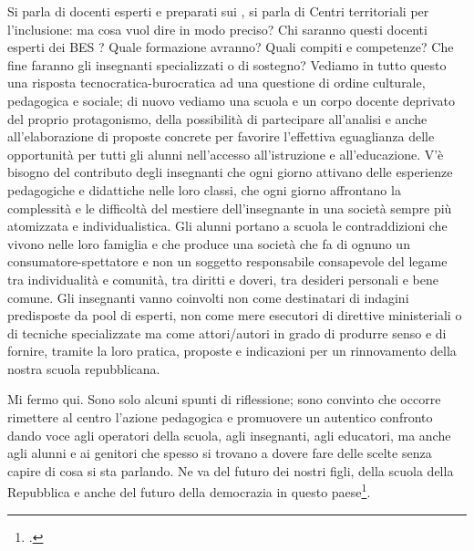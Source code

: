  Si parla di docenti esperti e preparati sui , si parla di Centri territoriali per l'inclusione: ma cosa vuol dire in modo preciso? Chi saranno questi docenti esperti dei BES ? Quale formazione avranno? Quali compiti e competenze? Che fine faranno gli insegnanti specializzati o di sostegno? Vediamo in tutto questo una risposta tecnocratica-burocratica ad una questione di ordine culturale, pedagogica e sociale; di nuovo vediamo una scuola e un corpo docente deprivato del proprio protagonismo, della possibilità di partecipare all'analisi e anche all'elaborazione di proposte concrete per favorire l'effettiva eguaglianza delle opportunità per tutti gli alunni nell'accesso all'istruzione e all'educazione. V'è bisogno del contributo degli insegnanti che ogni giorno attivano delle esperienze pedagogiche e didattiche nelle loro classi, che ogni giorno affrontano la complessità e le difficoltà del mestiere dell'insegnante in una società sempre più atomizzata e individualistica. Gli alunni portano a scuola le contraddizioni che vivono nelle loro famiglia e che produce una società che fa di ognuno un consumatore-spettatore e non un soggetto responsabile consapevole del legame tra individualità e comunità, tra diritti e doveri, tra desideri personali e bene comune. Gli insegnanti vanno coinvolti non come destinatari di indagini predisposte da pool di esperti, non come mere esecutori di direttive ministeriali o di tecniche specializzate ma come attori/autori in grado di produrre senso e di fornire, tramite la loro pratica, proposte e indicazioni per un rinnovamento della nostra scuola repubblicana.
 
 Mi fermo qui. Sono solo alcuni spunti di riflessione; sono convinto che occorre rimettere al centro l'azione pedagogica e promuovere un autentico confronto dando voce agli operatori della scuola, agli insegnanti, agli educatori, ma anche agli alunni e ai genitori che spesso si trovano a dovere fare delle scelte senza capire di cosa si sta parlando. Ne va del futuro dei nostri figli, della scuola della Repubblica e anche del futuro della democrazia in questo paese\footcite{Goussot2013}.